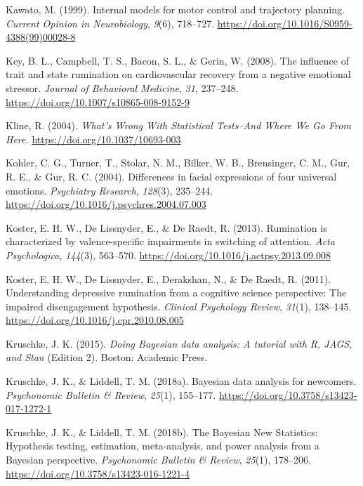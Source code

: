 \documentclass[a4paper,12pt,twoside,openright,oldfontcommands]{memoir}
\begin{document}
\hypertarget{ref-kawato_internal_1999}{}
Kawato, M. (1999). Internal models for motor control and trajectory
planning. \emph{Current Opinion in Neurobiology}, \emph{9}(6), 718--727.
\url{https://doi.org/10.1016/S0959-4388(99)00028-8}

\hypertarget{ref-Key2008}{}
Key, B. L., Campbell, T. S., Bacon, S. L., \& Gerin, W. (2008). The
influence of trait and state rumination on cardiovascular recovery from
a negative emotional stressor. \emph{Journal of Behavioral Medicine},
\emph{31}, 237--248. \url{https://doi.org/10.1007/s10865-008-9152-9}

\hypertarget{ref-Kline2004}{}
Kline, R. (2004). \emph{What's Wrong With Statistical Tests--And Where
We Go From Here.} \url{https://doi.org/10.1037/10693-003}

\hypertarget{ref-kohler_differences_2004}{}
Kohler, C. G., Turner, T., Stolar, N. M., Bilker, W. B., Brensinger, C.
M., Gur, R. E., \& Gur, R. C. (2004). Differences in facial expressions
of four universal emotions. \emph{Psychiatry Research}, \emph{128}(3),
235--244. \url{https://doi.org/10.1016/j.psychres.2004.07.003}

\hypertarget{ref-Koster2013}{}
Koster, E. H. W., De Lissnyder, E., \& De Raedt, R. (2013). Rumination
is characterized by valence-specific impairments in switching of
attention. \emph{Acta Psychologica}, \emph{144}(3), 563--570.
\url{https://doi.org/10.1016/j.actpsy.2013.09.008}

\hypertarget{ref-Koster2011}{}
Koster, E. H. W., De Lissnyder, E., Derakshan, N., \& De Raedt, R.
(2011). Understanding depressive rumination from a cognitive science
perspective: The impaired disengagement hypothesis. \emph{Clinical
Psychology Review}, \emph{31}(1), 138--145.
\url{https://doi.org/10.1016/j.cpr.2010.08.005}

\hypertarget{ref-kruschke_doing_2015}{}
Kruschke, J. K. (2015). \emph{Doing Bayesian data analysis: A tutorial
with R, JAGS, and Stan} (Edition 2). Boston: Academic Press.

\hypertarget{ref-kruschke_bayesian_2018}{}
Kruschke, J. K., \& Liddell, T. M. (2018a). Bayesian data analysis for
newcomers. \emph{Psychonomic Bulletin \& Review}, \emph{25}(1),
155--177. \url{https://doi.org/10.3758/s13423-017-1272-1}

\hypertarget{ref-kruschke_bayesian_2018-1}{}
Kruschke, J. K., \& Liddell, T. M. (2018b). The Bayesian New Statistics:
Hypothesis testing, estimation, meta-analysis, and power analysis from a
Bayesian perspective. \emph{Psychonomic Bulletin \& Review},
\emph{25}(1), 178--206. \url{https://doi.org/10.3758/s13423-016-1221-4}
\end{document}
